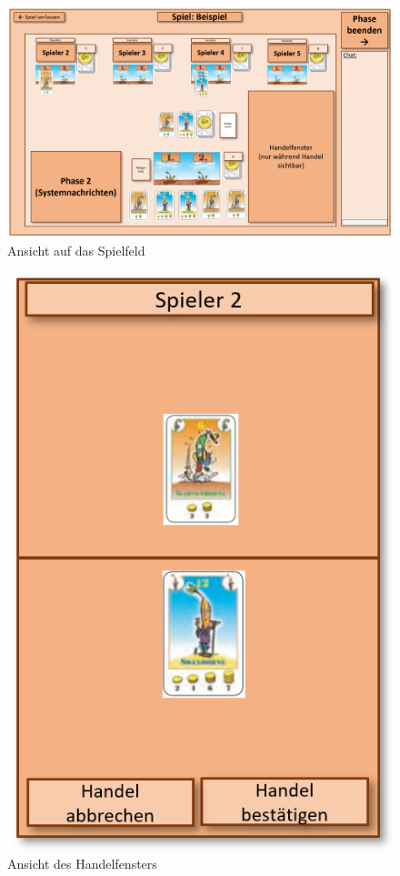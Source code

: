 \begin{figure}
	\centering
	\includegraphics{img/spiel}
	\caption{Ansicht auf das Spielfeld}
	\label{gui:spiel}
\end{figure}

\begin{figure}
	\centering
	\includegraphics{img/handel}
	\caption{Ansicht des Handelfensters}
	\label{gui:handel}
\end{figure}

